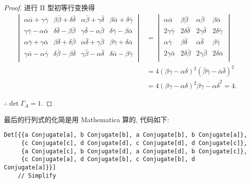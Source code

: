 \documentclass[color=black,device=normal,lang=cn,mode=geye]{elegantnote}
\begin{document}
\begin{landscape}
\begin{proof}
        进行 II 型初等行变换得
        \begin{align*}
            \begin{vmatrix}
                \alpha\bar{\alpha}+\gamma\bar{\gamma} & \beta\bar{\beta}+\delta\bar{\delta} & \alpha\bar{\beta}+\gamma\bar{\delta} & \beta\bar{\alpha}+\delta\bar{\gamma} \\
                \gamma\bar{\gamma}-\alpha\bar{\alpha} & \delta\bar{\delta}-\beta\bar{\beta} & \gamma\bar{\delta}-\alpha\bar{\beta} & \delta\bar{\gamma}-\beta\bar{\alpha} \\
                \alpha\bar{\gamma}+\gamma\bar{\alpha} & \beta\bar{\delta}+\delta\bar{\beta} & \alpha\bar{\delta}+\gamma\bar{\beta} & \beta\bar{\gamma}+\delta\bar{\alpha} \\
                \gamma\bar{\alpha}-\alpha\bar{\gamma} & \delta\bar{\beta}-\beta\bar{\delta} & \gamma\bar{\beta}-\alpha\bar{\delta} & \delta\bar{\alpha}-\beta\bar{\gamma} \\
            \end{vmatrix} & =\begin{vmatrix}
                \alpha\bar{\alpha} & \beta\bar{\beta} & \alpha\bar{\beta} & \beta\bar{\alpha} \\
                2\gamma\bar{\gamma} & 2\delta\bar{\delta} & 2\gamma\bar{\delta} & 2\delta\bar{\gamma} \\
                \alpha\bar{\gamma} & \beta\bar{\delta} & \alpha\bar{\delta} & \beta\bar{\gamma} \\
                2\gamma\bar{\alpha} & 2\delta\bar{\beta} & 2\gamma\bar{\beta} & 2\delta\bar{\alpha} \\
            \end{vmatrix} \\
            & =4(\beta\gamma-\alpha\delta)^2(\bar{\beta}\bar{\gamma}-\bar{\alpha}\bar{\delta})^2 \\
            & =4(\beta\gamma-\alpha\delta)^2\overline{\beta\gamma-\alpha\delta}^2=4.
        \end{align*}
    
        $\therefore\det\Gamma_A=1$.
    \end{proof}
\end{landscape}
\begin{note}
    最后的行列式的化简是用 Mathematica 算的, 代码如下:
    \begin{verbatim}
Det[{{a Conjugate[a], b Conjugate[b], a Conjugate[b], b Conjugate[a]},
     {c Conjugate[c], d Conjugate[d], c Conjugate[d], d Conjugate[c]},
     {a Conjugate[c], b Conjugate[d], a Conjugate[d], b Conjugate[c]},
     {c Conjugate[a], d Conjugate[b], c Conjugate[b], d Conjugate[a]}}]
    // Simplify
    \end{verbatim}
\end{note}
\printbibliography
\end{document}

